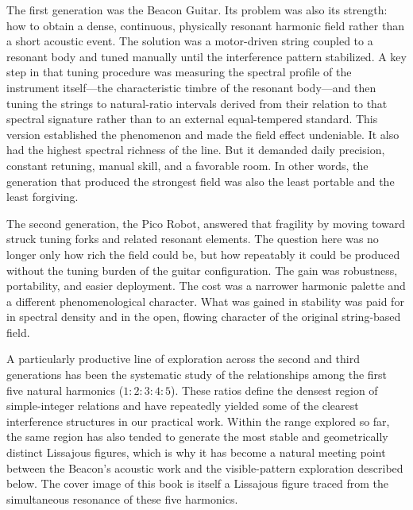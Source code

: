 The first generation was the Beacon Guitar. Its problem was also its strength: how to obtain a dense, continuous, physically resonant harmonic field rather than a short acoustic event. The solution was a motor-driven string coupled to a resonant body and tuned manually until the interference pattern stabilized. A key step in that tuning procedure was measuring the spectral profile of the instrument itself---the characteristic timbre of the resonant body---and then tuning the strings to natural-ratio intervals derived from their relation to that spectral signature rather than to an external equal-tempered standard. This version established the phenomenon and made the field effect undeniable. It also had the highest spectral richness of the line. But it demanded daily precision, constant retuning, manual skill, and a favorable room. In other words, the generation that produced the strongest field was also the least portable and the least forgiving.

The second generation, the Pico Robot, answered that fragility by moving toward struck tuning forks and related resonant elements. The question here was no longer only how rich the field could be, but how repeatably it could be produced without the tuning burden of the guitar configuration. The gain was robustness, portability, and easier deployment. The cost was a narrower harmonic palette and a different phenomenological character. What was gained in stability was paid for in spectral density and in the open, flowing character of the original string-based field.

A particularly productive line of exploration across the second and third generations has been the systematic study of the relationships among the first five natural harmonics ($1\!:\!2\!:\!3\!:\!4\!:\!5$). These ratios define the densest region of simple-integer relations and have repeatedly yielded some of the clearest interference structures in our practical work. Within the range explored so far, the same region has also tended to generate the most stable and geometrically distinct Lissajous figures, which is why it has become a natural meeting point between the Beacon's acoustic work and the visible-pattern exploration described below. The cover image of this book is itself a Lissajous figure traced from the simultaneous resonance of these five harmonics.

